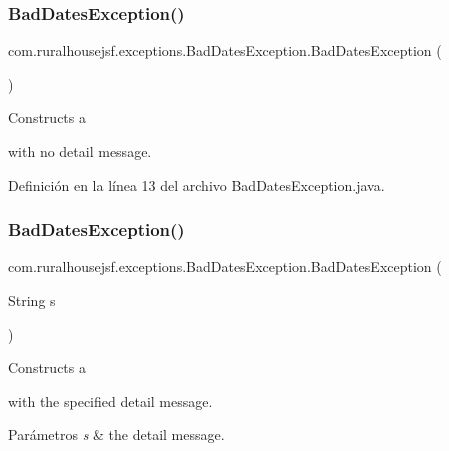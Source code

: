 \subsubsection{\texorpdfstring{BadDatesException()}{BadDatesException()}\hspace{0.1cm}{\footnotesize\ttfamily [1/2]}}
{\footnotesize\ttfamily com.\+ruralhousejsf.\+exceptions.\+Bad\+Dates\+Exception.\+Bad\+Dates\+Exception (\begin{DoxyParamCaption}{ }\end{DoxyParamCaption})}

Constructs a
\begin{DoxyCode}{0}
\end{DoxyCode}
 with no detail message. 

Definición en la línea 13 del archivo Bad\+Dates\+Exception.\+java.

\mbox{\label{classcom_1_1ruralhousejsf_1_1exceptions_1_1_bad_dates_exception_ace7222589b4c31c6b4a3d44d952c512a}} 
\subsubsection{\texorpdfstring{BadDatesException()}{BadDatesException()}\hspace{0.1cm}{\footnotesize\ttfamily [2/2]}}
{\footnotesize\ttfamily com.\+ruralhousejsf.\+exceptions.\+Bad\+Dates\+Exception.\+Bad\+Dates\+Exception (\begin{DoxyParamCaption}\item[{String}]{s }\end{DoxyParamCaption})}

Constructs a
\begin{DoxyCode}{0}
\end{DoxyCode}
 with the specified detail message.


\begin{DoxyParams}{Parámetros}
{\em s} & the detail message. \\
\hline
\end{DoxyParams}


